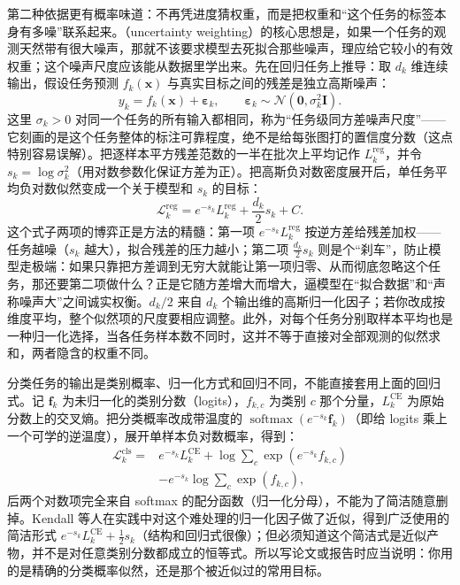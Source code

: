 第二种依据更有概率味道：不再凭进度猜权重，而是把权重和“这个任务的标签本身有多噪”联系起来。（uncertainty weighting）的核心思想是，如果一个任务的观测天然带有很大噪声，那就不该要求模型去死拟合那些噪声，理应给它较小的有效权重；这个噪声尺度应该能从数据里学出来。先在回归任务上推导：取 $d_k$ 维连续输出，假设任务预测 $f_k(\bm x)$ 与真实目标之间的残差是独立高斯噪声：
\begin{equation}
  y_k=f_k(\bm x)+\bm\varepsilon_k,
  \qquad
  \bm\varepsilon_k\sim
  \mathcal N(\bm0,\sigma_k^2\bm I).
\end{equation}
这里 $\sigma_k>0$ 对同一个任务的所有输入都相同，称为“任务级同方差噪声尺度”——它刻画的是这个任务整体的标注可靠程度，绝不是给每张图打的置信度分数（这点特别容易误解）。把逐样本平方残差范数的一半在批次上平均记作 $L_k^{\mathrm{reg}}$，并令 $s_k=\log\sigma_k^2$（用对数参数化保证方差为正）。把高斯负对数密度展开后，单任务平均负对数似然变成一个关于模型和 $s_k$ 的目标：
\begin{equation}
  \mathcal L_k^{\mathrm{reg}}
  =e^{-s_k}L_k^{\mathrm{reg}}
   +\frac{d_k}{2}s_k+C.
  \label{eq:ket-sharing-uncertainty-regression}
\end{equation}
这个式子两项的博弈正是方法的精髓：第一项 $e^{-s_k}L_k^{\mathrm{reg}}$ 按逆方差给残差加权——任务越噪（$s_k$ 越大），拟合残差的压力越小；第二项 $\frac{d_k}{2}s_k$ 则是个“刹车”，防止模型走极端：如果只靠把方差调到无穷大就能让第一项归零、从而彻底忽略这个任务，那还要第二项做什么？正是它随方差增大而增大，逼模型在“拟合数据”和“声称噪声大”之间诚实权衡。$d_k/2$ 来自 $d_k$ 个输出维的高斯归一化因子；若你改成按维度平均，整个似然项的尺度要相应调整。此外，对每个任务分别取样本平均也是一种归一化选择，当各任务样本数不同时，这并不等于直接对全部观测的似然求和，两者隐含的权重不同。

分类任务的输出是类别概率、归一化方式和回归不同，不能直接套用上面的回归式。记 $\bm f_k$ 为未归一化的类别分数（logits），$f_{k,c}$ 为类别 $c$ 那个分量，$L_k^{\mathrm{CE}}$ 为原始分数上的交叉熵。把分类概率改成带温度的 $\operatorname{softmax}(e^{-s_k}\bm f_k)$（即给 logits 乘上一个可学的逆温度），展开单样本负对数概率，得到：
\begin{align}
  \mathcal L_k^{\mathrm{cls}}
  ={}&e^{-s_k}L_k^{\mathrm{CE}}
  +\log\sum_c\exp(e^{-s_k}f_{k,c})
  \nonumber\\
  &-e^{-s_k}\log\sum_c\exp(f_{k,c}),
  \label{eq:ket-sharing-uncertainty-classification}
\end{align}
后两个对数项完全来自 softmax 的配分函数（归一化分母），不能为了简洁随意删掉。Kendall 等人在实践中对这个难处理的归一化因子做了近似，得到广泛使用的简洁形式 $e^{-s_k}L_k^{\mathrm{CE}}+\frac12s_k$（结构和回归式很像）；但必须知道这个简洁式是近似产物，并不是对任意类别分数都成立的恒等式。所以写论文或报告时应当说明：你用的是精确的分类概率似然，还是那个被近似过的常用目标。

